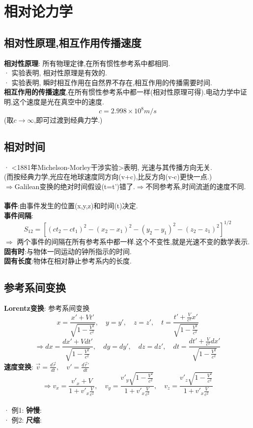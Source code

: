 \documentclass{article}
\begin{document}
\section{相对论力学}
\subsection{相对性原理,相互作用传播速度}
\textbf{相对性原理}: 所有物理定律,在所有惯性参考系中都相同.\\
· 实验表明, 相对性原理是有效的.\\
· 实验表明, 瞬时相互作用在自然界不存在,相互作用的传播需要时间.\\
\textbf{相互作用的传播速度},在所有惯性参考系中都一样(相对性原理可得).\quad 电动力学中证明,这个速度是光在真空中的速度.
\[c = 2.998 \times 10^8 m/s\]
(取$c\to \infty$,即可过渡到经典力学.)\\


\subsection{相对时间}
· <1881年Michelson-Morley干涉实验>表明, 光速与其传播方向无关.\\
(而按经典力学,光应在地球速度同方向(v+c),比反方向(v-c)更快一点.)\\
$\Rightarrow$Galilean变换的绝对时间假设(t=t')错了.\quad  $\Rightarrow$不同参考系,时间流逝的速度不同.\\
\\
\textbf{事件}:由事件发生的位置(x,y,z)和时间(t)决定.\\
\textbf{事件间隔}:
\[S_{12} = [(ct_2-ct_1)^2 - (x_2-x_1)^2 - (y_2-y_1)^2 - (z_2-z_1)^2]^{1/2}\]
$\Rightarrow$ 两个事件的间隔在所有参考系中都一样.\quad 这个不变性,就是光速不变的数学表示.\\
\textbf{固有时}:与物体一同运动的钟所指示的时间.\\
\textbf{固有长度}:物体在相对静止参考系内的长度.


\subsection{参考系间变换}
\textbf{Lorentz变换}: 参考系间变换
\[ x = \frac{x' + V t'}{\sqrt{1 - \frac{V^2}{c^2}}},\quad y=y',\quad z=z'
, \quad t = \frac{t'+ \frac{V}{c^2}x'}{\sqrt{1 - \frac{V^2}{c^2}}}\]
\[ \Rightarrow dx = \frac{dx' + V dt'}{\sqrt{1 - \frac{V^2}{c^2}}},\quad dy=dy',\quad dz=dz'
, \quad dt = \frac{dt'+ \frac{V}{c^2}dx'}{\sqrt{1 - \frac{V^2}{c^2}}}\]
\textbf{速度变换}: $\vec v = \frac{d\vec r}{dt},\quad v' = \frac{d\vec r'}{dt}$
\[\Rightarrow v_x = \frac{v'_x + V}{1 + v'_x \frac{V}{c^2}}, \quad v_y = \frac{v'_y \sqrt{1 - \frac{V^2}{c^2}}}{1 + v'_x \frac{V}{c^2}},\quad v_z = \frac{v'_z \sqrt{1 - \frac{V^2}{c^2}}}{1 + v'_x \frac{V}{c^2}}\]\\
· 例1: \textbf{钟慢}:\\
· 例2: \textbf{尺缩}:\\
\end{document}
